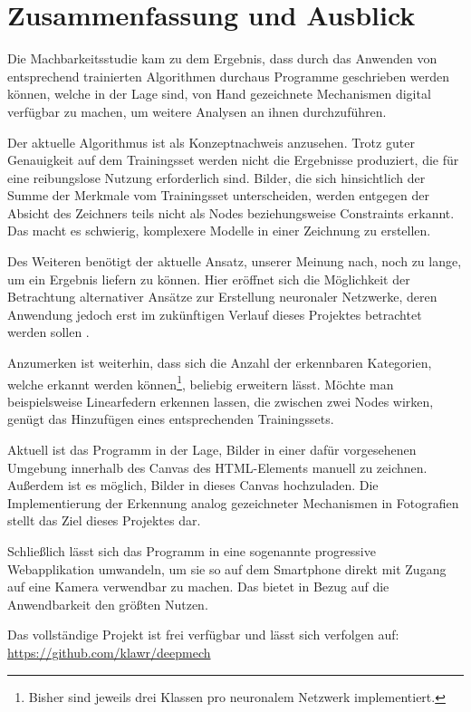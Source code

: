 \section{Zusammenfassung und Ausblick}
Die Machbarkeitsstudie kam zu dem Ergebnis, dass durch das Anwenden von entsprechend trainierten Algorithmen durchaus Programme geschrieben werden können, welche in der Lage sind, von Hand gezeichnete Mechanismen digital verfügbar zu machen, um weitere Analysen an ihnen durchzuführen.

Der aktuelle Algorithmus ist als Konzeptnachweis anzusehen.
Trotz guter Genauigkeit auf dem Trainingsset werden nicht die Ergebnisse produziert, die für eine reibungslose Nutzung erforderlich sind.
Bilder, die sich hinsichtlich der Summe der Merkmale vom Trainingsset unterscheiden, werden entgegen der Absicht des Zeichners teils nicht als Nodes beziehungsweise Constraints erkannt.
Das macht es schwierig, komplexere Modelle in einer Zeichnung zu erstellen.

Des Weiteren benötigt der aktuelle Ansatz, unserer Meinung nach, noch zu lange, um ein Ergebnis liefern zu können.
Hier eröffnet sich die Möglichkeit der Betrachtung alternativer Ansätze zur Erstellung neuronaler Netzwerke, deren Anwendung jedoch erst im zukünftigen Verlauf dieses Projektes betrachtet werden sollen \cite{Redmon2015, Redmon2016, Redmon2018}.

Anzumerken ist weiterhin, dass sich die Anzahl der erkennbaren Kategorien, welche erkannt werden können\footnote{Bisher sind jeweils drei Klassen pro neuronalem Netzwerk implementiert.}, beliebig erweitern lässt.
Möchte man beispielsweise Linearfedern erkennen lassen, die zwischen zwei Nodes wirken, genügt das Hinzufügen eines entsprechenden Trainingssets.

Aktuell ist das Programm in der Lage, Bilder in einer dafür vorgesehenen Umgebung innerhalb des Canvas des  HTML-Elements manuell zu zeichnen.
Au{\ss}erdem ist es möglich, Bilder in dieses Canvas hochzuladen.
Die Implementierung der Erkennung analog gezeichneter Mechanismen in Fotografien stellt das Ziel dieses Projektes dar.

Schlie{\ss}lich lässt sich das Programm in eine sogenannte progressive Webapplikation umwandeln, um sie so auf dem Smartphone direkt mit Zugang auf eine Kamera verwendbar zu machen.
Das bietet in Bezug auf die Anwendbarkeit den grö{\ss}ten Nutzen.

Das vollständige Projekt ist frei verfügbar und lässt sich verfolgen auf: \\
\url{https://github.com/klawr/deepmech}

